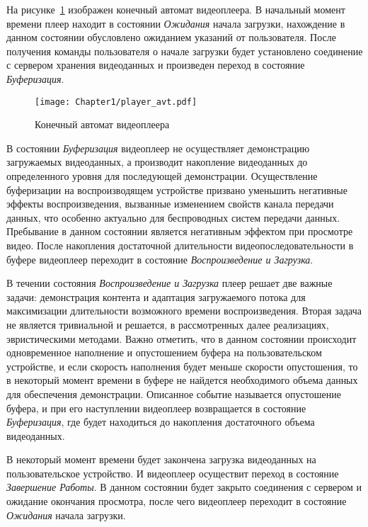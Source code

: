 На рисунке~\ref{fig:Player_avt} изображен конечный автомат видеоплеера. В начальный момент времени плеер находит в состоянии \textit{Ожидания} начала загрузки, нахождение в данном состоянии обусловлено ожиданием указаний от пользователя. После получения команды пользователя о начале загрузки будет установлено соединение с сервером хранения видеоданных и произведен переход в состояние \textit{Буферизация}.

\begin{figure}[htbp]
\begin{center}
\texttt{[image: Chapter1/player\_avt.pdf]}
\caption{Конечный автомат видеоплеера}
\label{fig:Player_avt}
\end{center}
\end{figure}

В состоянии \textit{Буферизация} видеоплеер не осуществляет демонстрацию загружаемых видеоданных, а производит накопление видеоданных до определенного уровня для последующей демонстрации. Осуществление буферизации на воспроизводящем устройстве призвано уменьшить негативные эффекты воспроизведения, вызванные изменением свойств канала передачи данных, что особенно актуально для беспроводных систем передачи данных. Пребывание в данном состоянии является негативным эффектом при просмотре видео. После накопления достаточной длительности видеопоследовательности в буфере видеоплеер переходит в состояние \textit{Воспроизведение и Загрузка}.

В течении состояния \textit{Воспроизведение и Загрузка} плеер решает две важные задачи: демонстрация контента и адаптация загружаемого потока для максимизации длительности возможного времени воспроизведения. Вторая задача не является тривиальной и решается, в рассмотренных далее реализациях, эвристическими методами. Важно отметить, что в данном состоянии происходит одновременное наполнение и опустошением буфера на пользовательском устройстве, и если скорость наполнения будет меньше скорости опустошения, то в некоторый момент времени в буфере не найдется необходимого объема данных для обеспечения демонстрации. Описанное событие называется опустошение буфера, и при его наступлении видеоплеер возвращается в состояние \textit{Буферизация}, где будет находиться до накопления достаточного объема видеоданных.

В некоторый момент времени будет закончена загрузка видеоданных на пользовательское устройство. И видеоплеер осуществит переход в состояние \textit{Завершение Работы}. В данном состоянии будет закрыто соединения с сервером и ожидание окончания просмотра, после чего видеоплеер переходит в состояние \textit{Ожидания} начала загрузки.

